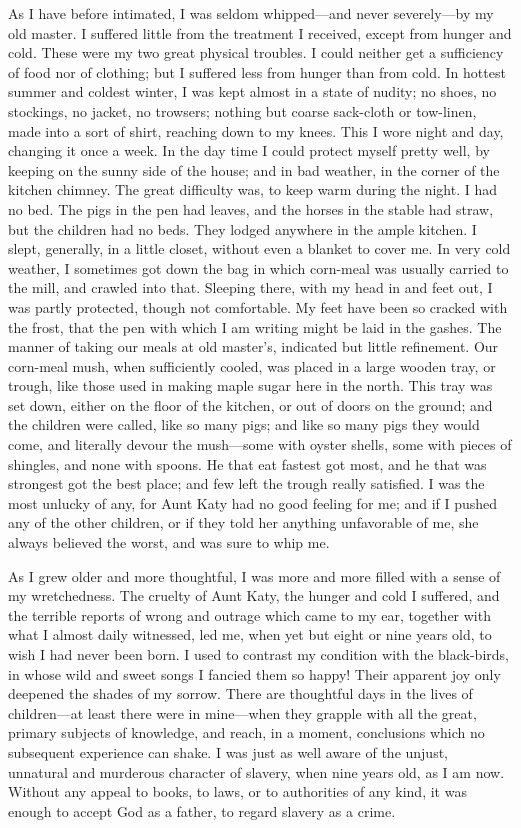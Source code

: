 As I have before intimated, I was seldom whipped---and never
severely---by my old master. I suffered little from the treatment I
received, except from hunger and cold. These were my two great physical
troubles. I could neither get a sufficiency of food nor of clothing; but
I suffered less from hunger than from cold. In hottest summer and
coldest winter, I was kept almost in a state of nudity; no shoes, no
stockings, no jacket, no trowsers; nothing but coarse sack-cloth or
tow-linen, made into a sort of shirt, reaching down to my knees. This I
wore night and day, changing it once a week. In the day time I could
protect myself pretty well, by keeping on the sunny side of the house;
and in bad weather, in the corner of the kitchen chimney. The great
difficulty was, to keep warm during the night. I had no bed. The pigs in
the pen had leaves, and the horses in the stable had straw, but the
children had no beds. They lodged anywhere in the ample kitchen. I
slept, generally, in a little closet, without even a blanket to cover
me. In very cold weather, I sometimes got down the bag in which
corn-meal was usually carried to the mill, and crawled into that.
Sleeping there, with my head in and feet out, I was partly protected,
though not comfortable. My feet have been so cracked with the frost,
that the pen with which I am writing might be laid in the gashes. The
manner of taking our meals at old master's, indicated but little
refinement. Our corn-meal mush, when sufficiently
{\protect\hypertarget{133}{}{}}cooled, was placed in a large wooden
tray, or trough, like those used in making maple sugar here in the
north. This tray was set down, either on the floor of the kitchen, or
out of doors on the ground; and the children were called, like so many
pigs; and like so many pigs they would come, and literally devour the
mush---some with oyster shells, some with pieces of shingles, and none
with spoons. He that eat fastest got most, and he that was strongest got
the best place; and few left the trough really satisfied. I was the most
unlucky of any, for Aunt Katy had no good feeling for me; and if I
pushed any of the other children, or if they told her anything
unfavorable of me, she always believed the worst, and was sure to whip
me.

As I grew older and more thoughtful, I was more and more filled with a
sense of my wretchedness. The cruelty of Aunt Katy, the hunger and cold
I suffered, and the terrible reports of wrong and outrage which came to
my ear, together with what I almost daily witnessed, led me, when yet
but eight or nine years old, to wish I had never been born. I used to
contrast my condition with the black-birds, in whose wild and sweet
songs I fancied them so happy! Their apparent joy only deepened the
shades of my sorrow. There are thoughtful days in the lives of
children---at least there were in mine---when they grapple with all the
great, primary subjects of knowledge, and reach, in a moment,
conclusions which no subsequent experience can shake. I was just as well
aware of the unjust, unnatural and murderous character of slavery, when
nine years old, as I am now. Without {\protect\hypertarget{134}{}{}}any
appeal to books, to laws, or to authorities of any kind, it was enough
to accept God as a father, to regard slavery as a crime.


